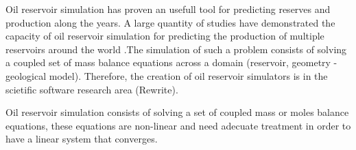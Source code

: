 %
%
%


Oil reservoir simulation has proven an usefull tool for predicting reserves and production along the years. A large quantity of studies have demonstrated the capacity of oil reservoir simulation for predicting the production of multiple reservoirs around the world .The simulation of such a problem consists of solving a coupled set of mass balance equations across a domain (reservoir, geometry - geological model). Therefore, the creation of oil reservoir simulators is in the scietific software research area (Rewrite). 




Oil reservoir simulation consists of solving a set of coupled mass or moles balance equations, these equations are non-linear and need adecuate treatment in order to have a linear system that converges.

